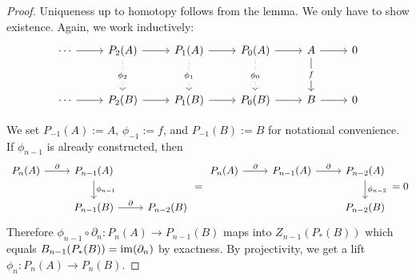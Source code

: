 \documentclass[fontsize=11pt,fleqn,a4paper]{scrartcl}
\begin{document}
\begin{proof}
Uniqueness up to homotopy follows from the lemma. We only have to show existence. Again, we work inductively:
\[\begin{tikzcd}[row sep=large]
\cdots \ar[r] &
P_2(A) \ar[r] \ar[d, dotted, "\phi_2" description] &
P_1(A) \ar[r] \ar[d, dotted, "\phi_1" description] &
P_0(A) \ar[r] \ar[d, dotted, "\phi_0" description] &
A \ar[r] \ar[d, "f" description] & 0\\
\cdots \ar[r] & P_2(B) \ar[r] & P_1(B) \ar[r] & P_0(B) \ar[r] &
B \ar[r] & 0
\end{tikzcd}\]

We set $P_{-1}(A):=A$, $\phi_{-1}:=f$,  and $P_{-1}(B):=B$ for notational convenience. If $\phi_{n-1}$ is already constructed, then
\[\begin{tikzcd}
P_n(A) \ar[r, "\partial"] & P_{n-1}(A) \ar[d, "\phi_{n-1}"] & \\
 & P_{n-1}(B) \ar[r, "\partial"] & P_{n-2}(B)
\end{tikzcd} = \begin{tikzcd}
P_n(A) \ar[r, "\partial"] & P_{n-1}(A) \ar[r, "\partial"] & P_{n-2}(A) \ar[d, "\phi_{n-2}"] \\
 & & P_{n-2}(B)
\end{tikzcd} = 0\]
Therefore $\phi_{n-1}\circ\partial_n: P_n(A) \to P_{n-1}(B)$ maps into $Z_{n-1}(P_\ast(B))$ which equals $B_{n-1}(P_\ast(B)) = \operatorname{im}(\partial_n)$ by exactness. By projectivity, we get a lift $\phi_n: P_n(A) \to P_n(B)$.
\end{proof}
\end{document}
